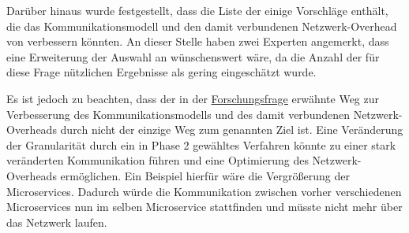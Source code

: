 Darüber hinaus wurde festgestellt, dass die Liste der \bpp einige Vorschläge enthält, die das Kommunikationsmodell und den damit verbundenen Netzwerk-Overhead von \jf verbessern könnten.
An dieser Stelle haben zwei Experten angemerkt, dass eine Erweiterung der Auswahl an \bpp wünschenswert wäre, da die Anzahl der für diese Frage nützlichen Ergebnisse als gering eingeschätzt wurde.

Es ist jedoch zu beachten, dass der in der \hyperref[forschungsfrage:1]{Forschungsfrage} erwähnte Weg zur Verbesserung des Kommunikationsmodells und des damit verbundenen Netzwerk-Overheads durch \bpp nicht der einzige Weg zum genannten Ziel ist.
Eine Veränderung der Granularität durch ein in Phase 2 gewähltes Verfahren könnte zu einer stark veränderten Kommunikation führen und eine Optimierung des Netzwerk-Overheads ermöglichen.
Ein Beispiel hierfür wäre die Vergrößerung der Microservices.
Dadurch würde die Kommunikation zwischen vorher verschiedenen Microservices nun im selben Microservice stattfinden und müsste nicht mehr über das Netzwerk laufen.

